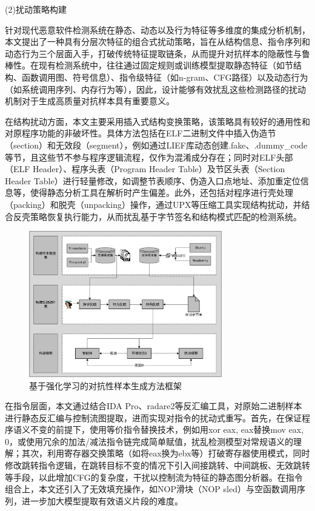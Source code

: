 (2)扰动策略构建

针对现代恶意软件检测系统在静态、动态以及行为特征等多维度的集成分析机制，本文提出了一种具有分层次特征的组合式扰动策略，旨在从结构信息、指令序列和动态行为三个层面入手，打破传统特征提取链条，从而提升对抗样本的隐蔽性与鲁棒性。在现有检测系统中，往往通过固定规则或训练模型提取静态特征（如节结构、函数调用图、符号信息）、指令级特征（如n-gram、CFG路径）以及动态行为（如系统调用序列、内存行为等），因此，设计能够有效扰乱这些检测路径的扰动机制对于生成高质量对抗样本具有重要意义。

在结构扰动方面，本文主要采用插入式结构变换策略，该策略具有较好的通用性和对原程序功能的非破坏性。具体方法包括在ELF二进制文件中插入伪造节（section）和无效段（segment），例如通过LIEF库\cite{LIEF2025}动态创建.fake、.dummy\_code等节，且这些节不参与程序逻辑流程，仅作为混淆成分存在；同时对ELF头部（ELF Header）、程序头表（Program Header Table）及节区头表（Section Header Table）进行轻量修改，如调整节表顺序、伪造入口点地址、添加重定位信息等，使得静态分析工具在解析时产生偏差。此外，还包括对程序进行壳处理（packing）和脱壳（unpacking）操作，通过UPX等压缩工具实现结构扰动，并结合反壳策略恢复执行能力，从而扰乱基于字节签名和结构模式匹配的检测系统。

\begin{figure}[hbt]
	\centering
	\includegraphics[width=0.75\textwidth]{figures/3.2}
	\caption{基于强化学习的对抗性样本生成方法框架}\label{fig:3.2}
\end{figure}


在指令层面，本文通过结合IDA Pro、radare2等反汇编工具，对原始二进制样本进行静态反汇编与控制流图提取，进而实现对指令的扰动式重写。首先，在保证程序语义不变的前提下，使用等价指令替换技术，例如用xor eax, eax替换mov eax, 0，或使用冗余的加法/减法指令链完成简单赋值，扰乱检测模型对常规语义的理解；其次，利用寄存器交换策略（如将eax换为ebx等）打破寄存器使用模式，同时修改跳转指令逻辑，在跳转目标不变的情况下引入间接跳转、中间跳板、无效跳转等手段，以此增加CFG的复杂度，干扰以控制流为特征的静态图分析器。在指令组合上，本文还引入了无效填充操作，如NOP滑块（NOP sled）与空函数调用序列，进一步加大模型提取有效语义片段的难度。

